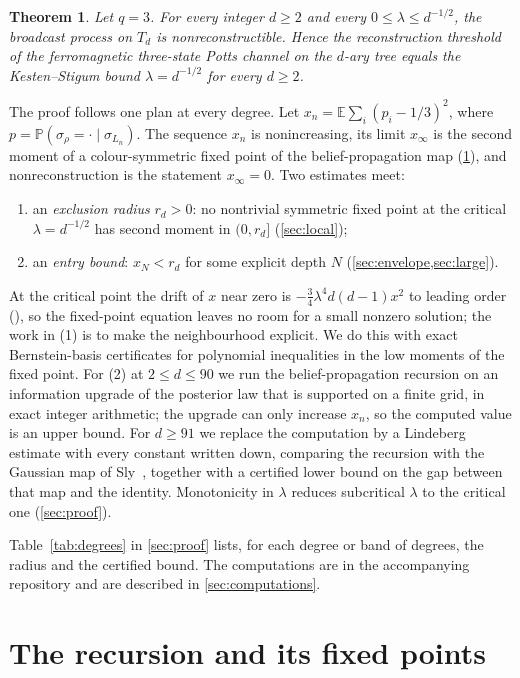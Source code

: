\documentclass[11pt]{amsart}
\newtheorem{theorem}{Theorem}[section]
\theoremstyle{definition}
\theoremstyle{remark}
\newcommand{\E}{\mathbb{E}}
\newcommand{\PP}{\mathbb{P}}
\begin{document}
\begin{theorem}\label{thm:main}
Let $q=3$. For every integer $d\ge2$ and every $0\le\lambda\le d^{-1/2}$, the broadcast process on $T_d$
is nonreconstructible. Hence the reconstruction threshold of the ferromagnetic three-state Potts channel
on the $d$-ary tree equals the Kesten--Stigum bound $\lambda=d^{-1/2}$ for every $d\ge2$.
\end{theorem}

The proof follows one plan at every degree. Let $x_n=\E\sum_i(p_i-1/3)^2$, where
$p=\PP(\sigma_\rho=\cdot\mid\sigma_{L_n})$. The sequence $x_n$ is nonincreasing, its limit $x_\infty$
is the second moment of a colour-symmetric fixed point of the belief-propagation map
(\cref{sec:fixed}), and nonreconstruction is the statement $x_\infty=0$. Two estimates meet:
\begin{enumerate}
\item an \emph{exclusion radius} $r_d>0$: no nontrivial symmetric fixed point at the critical
  $\lambda=d^{-1/2}$ has second moment in $(0,r_d]$ (\cref{sec:local});
\item an \emph{entry bound}: $x_N<r_d$ for some explicit depth $N$ (\cref{sec:envelope,sec:large}).
\end{enumerate}
At the critical point the drift of $x$ near zero is $-\tfrac34\lambda^4d(d-1)x^2$ to leading order
(\cite[(4.9)]{Sly11}), so the fixed-point equation leaves no room for a small nonzero solution; the work in
(1) is to make the neighbourhood explicit. We do this with exact Bernstein-basis certificates for
polynomial inequalities in the low moments of the fixed point. For (2) at $2\le d\le90$ we run the
belief-propagation recursion on an information upgrade of the posterior law that is supported on a
finite grid, in exact integer arithmetic; the upgrade can only increase $x_n$, so the computed value is an
upper bound. For $d\ge91$ we replace the computation by a Lindeberg estimate with every constant written
down, comparing the recursion with the Gaussian map of Sly~\cite{Sly11}, together with a certified lower
bound on the gap between that map and the identity. Monotonicity in $\lambda$ reduces subcritical
$\lambda$ to the critical one (\cref{sec:proof}).

Table~\ref{tab:degrees} in \cref{sec:proof} lists, for each degree or band of degrees, the radius and the
certified bound. The computations are in the accompanying repository and are described in
\cref{sec:computations}.

\section{The recursion and its fixed points}\label{sec:fixed}
\end{document}
